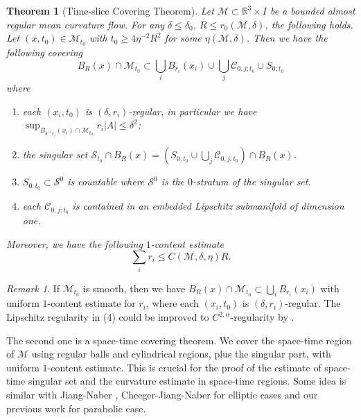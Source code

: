 \documentclass[11pt,reqno]{amsart}
\numberwithin{equation}{section}
\newcommand{\RR}{\mathds{R}}
\newcommand{\cC}{\mathcal{C}}
\newcommand{\cM}{\mathcal{M}}
\newcommand{\cS}{\mathcal{S}}
\newtheorem{theorem}[equation]{Theorem}
\theoremstyle{definition}
\theoremstyle{remark}
\newtheorem{remark}[equation]{Remark}
\theoremstyle{remark}
\theoremstyle{remark}
\theoremstyle{remark}\newtheorem{conjecture}[equation]{Conjecture}
\theoremstyle{remark}\newtheorem{question}[equation]{Question}
\begin{document}
\begin{theorem}[Time-slice Covering Theorem]\label{t:slice covering}
Let $\cM \subset \RR^3 \times I$ be a bounded almost regular mean curvature flow. For any $\delta \le \delta_0$, $R \le r_0(\cM,\delta)$,  the following holds. Let $(x,t_0) \in \cM_{t_0}$ with $t_0 \ge 4\eta^{-2}R^2$ for some $\eta(\cM,\delta)$. Then we have the following covering
    \begin{equation}
        B_R(x)\cap \cM_{t_0} \subset \bigcup_{i} B_{r_i}(x_i) \cup \bigcup_{j} \cC_{0,j;t_0} \cup S_{0;t_0}
    \end{equation}
where 
\begin{enumerate}
    \item each $(x_i,t_0)$ is $(\delta,r_i)$-regular, in particular we have $\sup_{B_{\delta^{-1}r_i}(x_i)\cap \cM_{t_0}} r_i|A| \le \delta^2$;
    \item the singular set $\cS_{t_0} \cap B_R(x) = (S_{0;t_0} \cup  \bigcup_j \cC_{0,j;t_0})\cap B_R(x)$. 
    \item $S_{0;t_0} \subset \cS^0$ is countable where $\cS^0$ is the $0$-stratum of the singular set. 
    \item each $\cC_{0,j;t_0}$ is contained in an embedded Lipschitz submanifold of dimension one. 
\end{enumerate}

Moreover, we have the following $1$-content estimate
\begin{equation}\label{e:slice 1 content}
    \sum_{i } r_i \le C(\cM,\delta,\eta) R.
\end{equation}
\end{theorem}



\begin{remark}
    If $\cM_{t_0}$ is smooth, then we have $B_R(x) \cap \cM_{t_0} \subset \bigcup_i B_{r_i}(x_i)$ with uniform $1$-content estimate for $r_i$, where each $(x_i,t_0)$ is $(\delta,r_i)$-regular.  The Lipschitz regularity in (4) could be improved to $C^{2,\alpha}$-regularity by \cite{SWX25}.
\end{remark}


The second one is a space-time covering theorem. We cover the space-time region of $\cM$ using regular balls and cylindrical regions, plus the singular part, with uniform $1$-content estimate. This is crucial for the proof of the estimate of space-time singular set and the curvature estimate in space-time regions. Some idea is similar with Jiang-Naber \cite{JN21}, Cheeger-Jiang-Naber \cite{CJN21} for elliptic cases and our previous work \cite{HJ24} for parabolic case. 
\end{document}
